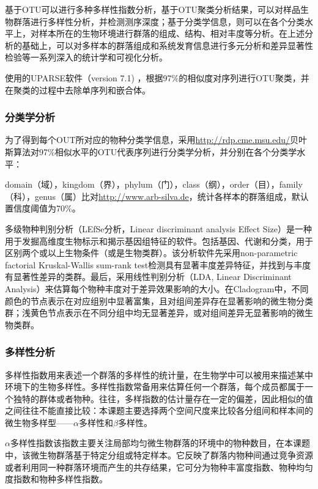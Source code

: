     基于OTU可以进行多种多样性指数分析，基于OTU聚类分析结果，可以对样品生物群落进行多样性分析，并检测测序深度；基于分类学信息，则可以在各个分类水平上，对样本所在的生物环境进行群落的组成、结构、相对丰度等分析。在上述分析的基础上，可以对多样本的群落组成和系统发育信息进行多元分析和差异显著性检验等一系列深入的统计学和可视化分析。

    使用的UPARSE软件（version 7.1) ，根据97\%的相似度对序列进行OTU聚类，并在聚类的过程中去除单序列和嵌合体。
    \subsubsection{分类学分析}
    为了得到每个OUT所对应的物种分类学信息，采用\href{RDP classifier}{http://rdp.cme.msu.edu/}贝叶斯算法对97\%相似水平的OTU代表序列进行分类学分析，并分别在各个分类学水平：

    domain（域），kingdom（界），phylum（门），class（纲），order（目），family（科），genus（属）比对\href{Silva数据库}{http://www.arb-silva.de}，统计各样本的群落组成，默认置信度阈值为70\%。

    多级物种判别分析（LEfSe分析，Linear discriminant analysis Effect Size）是一种用于发掘高维度生物标示和揭示基因组特征的软件。包括基因、代谢和分类，用于区别两个或以上生物条件（或是生物类群）。该分析软件先采用non-parametric factorial Kruskal-Wallis sum-rank test检测具有显著丰度差异特征，并找到与丰度有显著性差异的类群。最后，采用线性判别分析（LDA, Linear Discriminant Analysis）来估算每个物种丰度对于差异效果影响的大小。在Cladogram中，不同颜色的节点表示在对应组别中显著富集，且对组间差异存在显著影响的微生物分类群；浅黄色节点表示在不同分组中均无显著差异，或对组间差异无显著影响的微生物类群。

    \subsubsection{多样性分析}
    多样性指数用来表述一个群落的多样性的统计量，在生物学中可以被用来描述某中环境下的生物多样性。多样性指数常备用来估算任何一个群落，每个成员都属于一个独特的群体或者物种。往往，多样指数的估计量存在一定的偏差，因此相似的值之间往往不能直接比较：本课题主要选择两个空间尺度来比较各分组间和样本间的微生物多样型——$\alpha$多样性和$\beta$多样性。

    $\alpha$多样性指数该指数主要关注局部均匀微生物群落的环境中的物种数目，在本课题中，该微生物群落基于特定分组或特定样本。它反映了群落内物种间通过竞争资源或者利用同一种群落环境而产生的共存结果，它可分为物种丰富度指数、物种均匀度指数和物种多样性指数。

